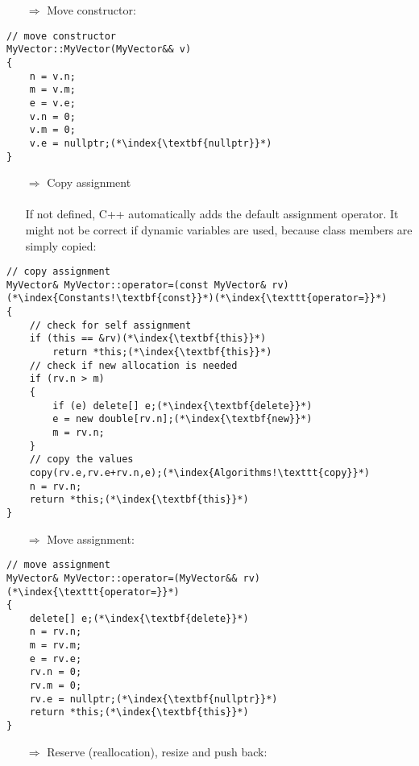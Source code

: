 \documentclass[10pt]{book}
\begin{document}
\begin{enumerate}
\item[$\Rightarrow$] Move constructor:
\end{enumerate}
\begin{lstlisting}
// move constructor
MyVector::MyVector(MyVector&& v)
{
    n = v.n;
    m = v.m;
    e = v.e;
    v.n = 0;
    v.m = 0;
    v.e = nullptr;(*\index{\textbf{nullptr}}*)
}
\end{lstlisting}
\begin{enumerate}
\item[$\Rightarrow$] Copy assignment\\ \\ If not defined, C++ automatically adds  the default assignment operator.
It might not be correct if dynamic variables are used, because class members are simply copied:
\end{enumerate}
\begin{lstlisting}
// copy assignment
MyVector& MyVector::operator=(const MyVector& rv)(*\index{Constants!\textbf{const}}*)(*\index{\texttt{operator=}}*)
{
    // check for self assignment
    if (this == &rv)(*\index{\textbf{this}}*)
        return *this;(*\index{\textbf{this}}*)
    // check if new allocation is needed
    if (rv.n > m)
    {
        if (e) delete[] e;(*\index{\textbf{delete}}*)
        e = new double[rv.n];(*\index{\textbf{new}}*)
        m = rv.n;
    }
    // copy the values
    copy(rv.e,rv.e+rv.n,e);(*\index{Algorithms!\texttt{copy}}*)
    n = rv.n;
    return *this;(*\index{\textbf{this}}*)
}
\end{lstlisting}
\begin{enumerate}
\item[$\Rightarrow$] Move assignment:
\end{enumerate}
\begin{lstlisting}
// move assignment
MyVector& MyVector::operator=(MyVector&& rv)(*\index{\texttt{operator=}}*)
{
    delete[] e;(*\index{\textbf{delete}}*)
    n = rv.n;
    m = rv.m;
    e = rv.e;
    rv.n = 0;
    rv.m = 0;
    rv.e = nullptr;(*\index{\textbf{nullptr}}*)
    return *this;(*\index{\textbf{this}}*)
}
\end{lstlisting}
\begin{enumerate}
\item[$\Rightarrow$] Reserve (reallocation), resize and push back:
\end{enumerate}
\end{document}
